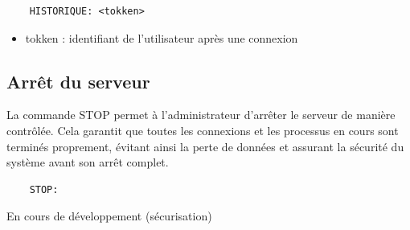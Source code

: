 \documentclass{report}
\begin{document}
\begin{verbatim}
	HISTORIQUE: <tokken>
\end{verbatim}

\begin{itemize}
	\item tokken : identifiant de l'utilisateur après une connexion
\end{itemize}

\subsection{Arrêt du serveur}

La commande STOP permet à l'administrateur d'arrêter le serveur de manière contrôlée. Cela garantit que toutes les connexions et les processus en cours sont terminés proprement, évitant ainsi la perte de données et assurant la sécurité du système avant son arrêt complet.

\begin{verbatim}
	STOP:
\end{verbatim}

En cours de développement (sécurisation)
\end{document}
